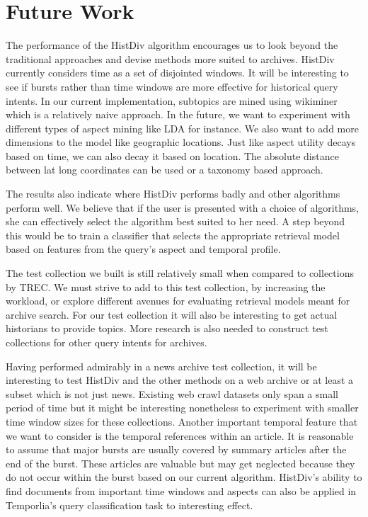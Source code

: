 \section{Future Work} %
\label{sec:future_work}

The performance of the HistDiv algorithm encourages us to look beyond the traditional approaches and devise methods more suited to archives. HistDiv currently considers time as a set of disjointed windows. It will be interesting to see if bursts rather than time windows are more effective for historical query intents. In our current implementation, subtopics are mined using wikiminer which is a relatively naive approach. In the future, we want to experiment with different types of aspect mining like LDA for instance. We also want to add more dimensions to the model like geographic locations. Just like aspect utility decays based on time, we can also decay it based on location. The absolute distance between lat long coordinates can be used or a taxonomy based approach.

The results also indicate where HistDiv performs badly and other algorithms perform well. We believe that if the user is presented with a choice of algorithms, she can effectively select the algorithm best suited to her need. A step beyond this would be to train a classifier that selects the appropriate retrieval model based on features from the query's aspect and temporal profile.

The test collection we built is still relatively small when compared to collections by TREC. We must strive to add to this test collection, by increasing the workload, or explore different avenues for evaluating retrieval models meant for archive search. For our test collection it will also be interesting to get actual historians to provide topics. More research is also needed to construct test collections for other query intents for archives. 

Having performed admirably in a news archive test collection, it will be interesting to test HistDiv and the other methods on a web archive or at least a subset which is not just news. Existing web crawl datasets only span a small period of time but it might be interesting nonetheless to experiment with smaller time window sizes for these collections. Another important temporal feature that we want to consider is the temporal references within an article. It is reasonable to assume that major bursts are usually covered by summary articles after the end of the burst. These articles are valuable but may get neglected because they do not occur within the burst based on our current algorithm. HistDiv's ability to find documents from important time windows and aspects can also be applied in Temporlia's query classification task to interesting effect.

